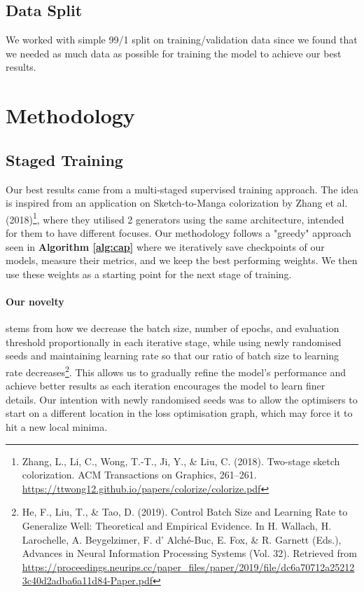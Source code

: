 \documentclass[twoside,english,notitlepage]{report}
\begin{document}
\subsection{Data Split}
We worked with simple 99/1 split on training/validation data since we found that we needed as much data as possible for training the model to achieve our best results. \\

\section{Methodology}

\subsection{Staged Training}\label{task1:staged-training}
Our best results came from a multi-staged supervised training approach. The idea is inspired from an application on Sketch-to-Manga colorization by Zhang et al. (2018)\footnote{Zhang, L., Li, C., Wong, T.-T., Ji, Y., \& Liu, C. (2018). Two-stage sketch colorization. ACM Transactions on Graphics, 261–261. \href{https://ttwong12.github.io/papers/colorize/colorize.pdf}{https://ttwong12.github.io/papers/colorize/colorize.pdf}}, where they utilised 2 generators using the same architecture, intended for them to have different focuses. 
Our methodology follows a "greedy" approach seen in \textbf{Algorithm \ref{alg:cap}} where we iteratively save checkpoints of our models, measure their metrics, and we keep the best performing weights. We then use these weights as a starting point for the next stage of training.
\paragraph*{\noindent Our novelty}stems from how we decrease the batch size, number of epochs, and evaluation threshold proportionally in each iterative stage, while using newly randomised seeds and maintaining learning rate so that our ratio of batch size to learning rate decreases\footnote{He, F., Liu, T., \& Tao, D. (2019). Control Batch Size and Learning Rate to Generalize Well: Theoretical and Empirical Evidence. In H. Wallach, H. Larochelle, A. Beygelzimer, F. d' Alché-Buc, E. Fox, \& R. Garnett (Eds.), Advances in Neural Information Processing Systems (Vol. 32). Retrieved from \\ \href{https://proceedings.neurips.cc/paper_files/paper/2019/file/dc6a70712a252123c40d2adba6a11d84-Paper.pdf}{https://proceedings.neurips.cc/paper\_files/paper/2019/file/dc6a70712a252123c40d2adba6a11d84-Paper.pdf}}. This allows us to gradually refine the model's performance and achieve better results as each iteration encourages the model to learn finer details. Our intention with newly randomised seeds was to allow the optimisers to start on a different location in the loss optimisation graph, which may force it to hit a new local minima. 
\end{document}

